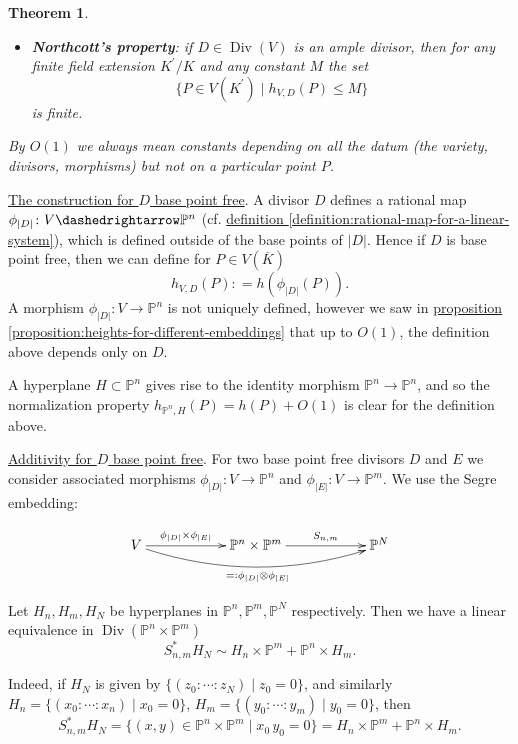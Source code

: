 \documentclass{article}
\newcommand{\refref}[2]{\hyperref[#2]{#1 \ref*{#2}}}
\newtheorem{theorem}[proposition]{Theorem}
\theoremstyle{definition}
\DeclareMathOperator{\Div}{Div}
\newcommand{\term}{\textbf}
\newcommand{\dfn}{\mathrel{\mathop:}=}
\newcommand{\rdfn}{=\mathrel{\mathop:}}
\newcommand{\PP}{\mathbb{P}}
\begin{document}
\begin{theorem}
\begin{itemize}
  \item \term{Northcott's property}: if $D \in \Div (V)$ is an ample divisor,
    then for any finite field extension $K^\prime/K$ and any constant $M$ the
    set
    $$\{ P \in V (K^\prime) \mid h_{V,D} (P) \le M \}$$
    is finite.
  \end{itemize}

  By $O (1)$ we always mean constants depending on all the datum (the variety,
  divisors, morphisms) but not on a particular point $P$.
\end{theorem}

\vspace{1em}

\noindent\underline{The construction for $D$ base point free}. A divisor $D$
defines a rational map $\phi_{|D|}\colon V\dashedrightarrow \PP^n$
(cf. \refref{definition}{definition:rational-map-for-a-linear-system}), which is
defined outside of the base points of $|D|$. Hence if $D$ is base point free,
then we can define for $P \in V (\overline{K})$
$$h_{V,D} (P) \dfn h (\phi_{|D|} (P)).$$
A morphism $\phi_{|D|}\colon V\to \PP^n$ is not uniquely defined, however we saw
in \refref{proposition}{proposition:heights-for-different-embeddings} that up to
$O(1)$, the definition above depends only on $D$.

A hyperplane $H \subset \PP^n$ gives rise to the identity morphism
$\PP^n \to \PP^n$, and so the normalization property
$h_{\PP^n,H} (P) = h (P) + O (1)$ is clear for the definition above.

\vspace{1em}

\noindent\underline{Additivity for $D$ base point free}. For two base point free
divisors $D$ and $E$ we consider associated morphisms
$\phi_{|D|}\colon V\to \PP^n$ and $\phi_{|E|}\colon V\to \PP^m$. We use the
Segre embedding:

\[ \xymatrix@C=2cm{ V \ar[r]^-{\phi_{|D|}\times \phi_{|E|}}\ar@/_1.5em/[rr]_{\rdfn \phi_{|D|}\otimes \phi_{|E|}} & \PP^n\times \PP^m \ar[r]^-{S_{n,m}} & \PP^N } \]

Let $H_n, H_m, H_N$ be hyperplanes in $\PP^n, \PP^m, \PP^N$ respectively. Then
we have a linear equivalence in $\Div (\PP^n\times \PP^m)$
$$S_{n,m}^* H_N \sim H_n\times \PP^m + \PP^n\times H_m.$$

Indeed, if $H_N$ is given by $\{ (z_0 : \cdots : z_N) \mid z_0 = 0 \}$, and
similarly $H_n = \{ (x_0 : \cdots : x_n) \mid x_0 = 0 \}$,
$H_m = \{ (y_0 : \cdots : y_m) \mid y_0 = 0 \}$, then
$$S_{n,m}^* H_N = \{ (x,y) \in \PP^n\times\PP^m \mid x_0\,y_0 = 0 \} = H_n\times \PP^m + \PP^n\times H_m.$$
\end{document}
